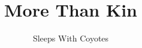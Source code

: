 \documentclass[ebook,12pt,oneside,onecolumn,openright,showtrim]{memoir}
\title{More Than Kin}
\author{Sleeps With Coyotes}
\date{}
\begin{document}
\frontmatter
\begin{titlingpage}
\setlength{\droptitle}{80pt}
\maketitle
\end{titlingpage}
\mainmatter
\pagestyle{plain}





\backmatter
\end{document}
